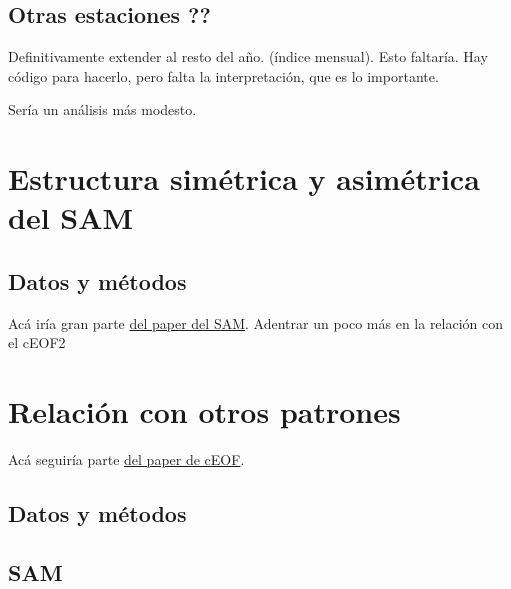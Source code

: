 \documentclass[12pt,oneside]{reedthesis}
\begin{document}
\hypertarget{otras-estaciones}{%
\section{Otras estaciones ??}\label{otras-estaciones}}

Definitivamente extender al resto del año.
(índice mensual).
Esto faltaría.
Hay código para hacerlo, pero falta la interpretación, que es lo importante.

Sería un análisis más modesto.

\hypertarget{estructura-simuxe9trica-y-asimuxe9trica-del-sam}{%
\chapter{Estructura simétrica y asimétrica del SAM}\label{estructura-simuxe9trica-y-asimuxe9trica-del-sam}}

\hypertarget{datos-y-muxe9todos-1}{%
\section{Datos y métodos}\label{datos-y-muxe9todos-1}}

Acá iría gran parte \href{https://github.com/eliocamp/asymsam}{del paper del SAM}. Adentrar un poco más en la relación con el cEOF2

\hypertarget{relaciuxf3n-con-otros-patrones}{%
\chapter{Relación con otros patrones}\label{relaciuxf3n-con-otros-patrones}}

Acá seguiría parte \href{https://github.com/eliocamp/shceof}{del paper de cEOF}.

\hypertarget{datos-y-muxe9todos-2}{%
\section{Datos y métodos}\label{datos-y-muxe9todos-2}}

\hypertarget{sam}{%
\section{SAM}\label{sam}}
\end{document}

